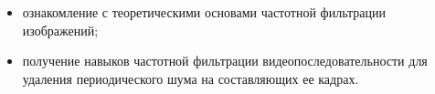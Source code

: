 
\begin{itemize}

	\item ознакомление с теоретическими основами частотной фильтрации изображений;
	\item получение навыков частотной фильтрации видеопоследовательности для удаления периодического шума на составляющих ее кадрах.

\end{itemize}

